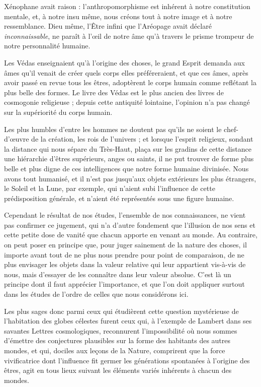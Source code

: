 \documentclass[a4paper, 11pt, oneside, landscape]{article}
\begin{document}
Xénophane avait raison : l'anthropomorphisme est inhérent à notre constitution mentale, et, à notre insu même, nous créons tout à notre image et à notre ressemblance. Dieu même, l'Être infini que l'Aréopage avait déclaré \emph{inconnaissable}, ne paraît à l'œil de notre âme qu'à travers le prisme trompeur de notre personnalité humaine.

Les Védas enseignaient qu'à l'origine des choses, le grand Esprit demanda aux âmes qu'il venait de créer quels corps elles préféreraient, et que ces âmes, après avoir passé en revue tous les êtres, adoptèrent le corps humain comme reflétant la plus belle des formes. Le livre des Védas est le plus ancien des livres de cosmogonie religieuse ; depuis cette antiquité lointaine, l'opinion n'a pas changé sur la supériorité du corps humain.

Les plus humbles d'entre les hommes ne doutent pas qu'ils ne soient le chef-d'œuvre de la création, les rois de l'univers ; et lorsque l'esprit religieux, sondant la distance qui nous sépare du Très-Haut, plaça sur les gradins de cette distance une hiérarchie d'êtres supérieurs, anges ou saints, il ne put trouver de forme plus belle et plus digne de ces intelligences que notre forme humaine divinisée. Nous avons tout humanisé, et il n'est pas jusqu'aux objets extérieurs les plus étrangers, le Soleil et la Lune, par exemple, qui n'aient subi l'influence de cette prédisposition générale, et n'aient été représentés sous une figure humaine.

Cependant le résultat de nos études, l'ensemble de nos connaissances, ne vient pas confirmer ce jugement, qui n'a d'autre fondement que l'illusion de nos sens et cette petite dose de vanité que chacun apporte en venant au monde. Au contraire, on peut poser en principe que, pour juger sainement de la nature des choses, il importe avant tout de ne plus nous prendre pour point de comparaison, de ne plus envisager les objets dans la valeur relative qui leur appartient vis-à-vis de nous, mais d'essayer de les connaître dans leur valeur absolue. C'est là un principe dont il faut apprécier l'importance, et que l'on doit appliquer surtout dans les études de l'ordre de celles que nous considérons ici.

Les plus sages donc parmi ceux qui étudièrent cette question mystérieuse de l'habitation des globes célestes furent ceux qui, à l'exemple de Lambert dans ses savantes Lettres cosmologiques, reconnurent l'impossibilité où nous sommes d'émettre des conjectures plausibles sur la forme des habitants des autres mondes, et qui, dociles aux leçons de la Nature, comprirent que la force vivificatrice dont l'influence fit germer les générations spontanées à l'origine des êtres, agit en tous lieux suivant les éléments variés inhérents à chacun des mondes.
\end{document}
